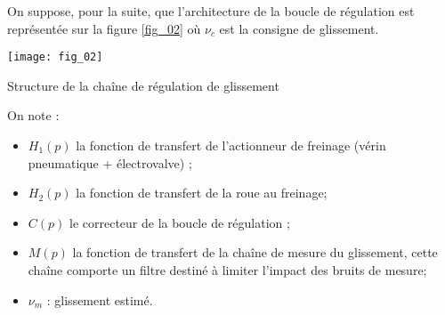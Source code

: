 
On suppose, pour la suite, que l’architecture de la boucle de régulation est représentée sur la figure \ref{fig_02} où $\nu_c$ est la consigne de glissement.



\begin{marginfigure}
\texttt{[image: fig\_02]}
\caption{Structure de la chaîne de régulation de glissement}
\label{fig_02}
\end{marginfigure}


On note : 
\begin{itemize}
\item $H_1(p)$ la fonction de transfert de l’actionneur de freinage (vérin pneumatique + électrovalve) ;
\item $H_2(p)$ la fonction de transfert de la roue au freinage;
\item $C(p)$ le correcteur de la boucle de régulation ;
\item $M(p)$ la fonction de transfert de la chaîne de mesure du glissement,%
 cette chaîne comporte un filtre destiné à limiter l’impact des bruits de mesure;
\item $\nu_m$ : glissement estimé.%
\end{itemize}

